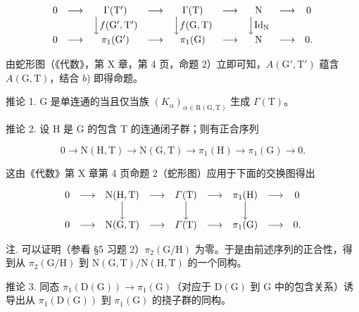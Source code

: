 \[
\begin{array}{c c c c c c c c c} 0 & \longrightarrow & \Gamma (\mathrm{T} ^ {\prime}) & \longrightarrow & \Gamma (\mathrm{T}) & \longrightarrow & \mathrm{N} & \longrightarrow & 0 \\ & & \Big \downarrow f (\mathrm{G} ^ {\prime}, \mathrm{T} ^ {\prime}) & & \Big \downarrow f (\mathrm{G}, \mathrm{T}) & & \Big \downarrow \mathrm{Id} _ {\mathrm{N}} \\ 0 & \longrightarrow & \pi_ {1} (\mathrm{G} ^ {\prime}) & \longrightarrow & \pi_ {1} (\mathrm{G}) & \longrightarrow & \mathrm{N} & \longrightarrow & 0. \end{array}
\]

由蛇形图（《代数》，第 X 章，第 4 页，命题 2）立即可知，\(A(\mathrm{G}', \mathrm{T}')\) 蕴含 \(A(\mathrm{G}, \mathrm{T})\)，结合 \(b\)) 即得命题。

推论 1. G 是单连通的当且仅当族 \((K_{\alpha})_{\alpha \in \mathrm{R}(\mathrm{G},\mathrm{T})}\) 生成 \(\Gamma (\mathrm{T})\)。

推论 2. 设 H 是 G 的包含 T 的连通闭子群；则有正合序列

\[
0 \longrightarrow \mathrm{N} (\mathrm{H}, \mathrm{T}) \longrightarrow \mathrm{N} (\mathrm{G}, \mathrm{T}) \longrightarrow \pi_ {1} (\mathrm{H}) \longrightarrow \pi_ {1} (\mathrm{G}) \longrightarrow 0.
\]

这由《代数》第 X 章第 4 页命题 2（蛇形图）应用于下面的交换图得出

\[
\begin{array}{c c c c c c c c c} 0 & \longrightarrow & \mathrm{N(H,T)} & \longrightarrow & \varGamma (\mathrm{T}) & \longrightarrow & \pi_ {1} (\mathrm{H}) & \longrightarrow & 0 \\ & & \Big \downarrow & & \Big \downarrow & & \Big \downarrow & & \\ 0 & \longrightarrow & \mathrm{N(G,T)} & \longrightarrow & \varGamma (\mathrm{T}) & \longrightarrow & \pi_ {1} (\mathrm{G}) & \longrightarrow & 0. \end{array}
\]

注. 可以证明（参看 §5 习题 2）\(\pi_2(\mathrm{G / H})\) 为零。于是由前述序列的正合性，得到从 \(\pi_2(\mathrm{G / H})\) 到 \(\mathrm{N(G,T) / N(H,T)}\) 的一个同构。

推论 3. 同态 \(\pi_1(\mathrm{D}(\mathrm{G})) \to \pi_1(\mathrm{G})\)（对应于 \(\mathrm{D}(\mathrm{G})\) 到 \(\mathrm{G}\) 中的包含关系）诱导出从 \(\pi_1(\mathrm{D}(\mathrm{G}))\) 到 \(\pi_1(\mathrm{G})\) 的挠子群的同构。

